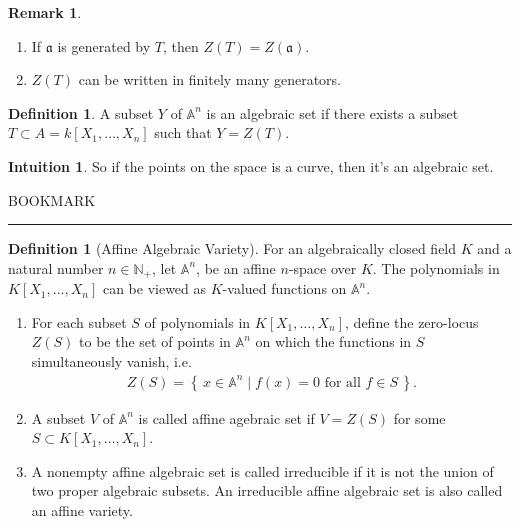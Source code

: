\documentclass[11pt]{book}
\theoremstyle{definition}
\newtheorem{definition}[theorem]{Definition}
\newtheorem{remark}[theorem]{Remark}
\newtheorem{intuition}[theorem]{Intuition}
\numberwithin{equation}{section}
\newcommand{\makeset}[2]{\left\{\, #1 \mathrel{\mid} #2 \,\right\}}
\begin{document}
\begin{rembox}
\begin{remark}
    \begin{enumerate}
        \item If \(\mathfrak{a}\) is generated by \(T\), then \(Z(T) = Z(\mathfrak{a})\).
        \item \(Z(T)\) can be written in finitely many generators.
    \end{enumerate}
\end{remark}
\end{rembox}


\begin{defbox}
    \begin{definition}
        A subset \(Y\) of \(\mathbb{A}^n\) is an algebraic set if there exists a subset \(T \subset A = k[X_1, \ldots, X_n]\) such that \(Y = Z(T)\).
    \end{definition}
\end{defbox}
\begin{intbox}
    \begin{intuition}
        So if the points on the space is a curve, then it's an algebraic set.
    \end{intuition}
\end{intbox}
BOOKMARK
\newline
\rule{\textwidth}{0.4pt}
\newline
\begin{defbox}
    \begin{definition}[Affine Algebraic Variety]
        For an algebraically closed field \(K\) and a natural number \(n \in \mathbb{N}_+\), let \(\mathbb{A}^n\), be an affine \(n\)-space over \(K\). The polynomials in \(K[X_1, \ldots, X_n]\) can be viewed as \(K\)-valued functions on \(\mathbb{A}^n\).
        \begin{enumerate}
            \item For each subset \(S\) of polynomials in \(K[X_1, \ldots, X_n]\), define the zero-locus \(Z(S)\) to be the set of points in \(\mathbb{A}^n\) on which the functions in \(S\) simultaneously vanish, i.e.
            \begin{align*}
                Z(S) = \makeset{x \in \mathbb{A}^n}{f(x) = 0 \text{ for all } f \in S} \text{.}
            \end{align*}
            \item A subset \(V\) of \(\mathbb{A}^n\) is called affine agebraic set if \(V = Z(S)\) for some \(S \subset K[X_1, \ldots, X_n]\).
            \item A nonempty affine algebraic set is called irreducible if it is not the union of two proper algebraic subsets. An irreducible affine algebraic set is also called an affine variety.
        \end{enumerate}
    \end{definition}
\end{defbox}
\end{document}
